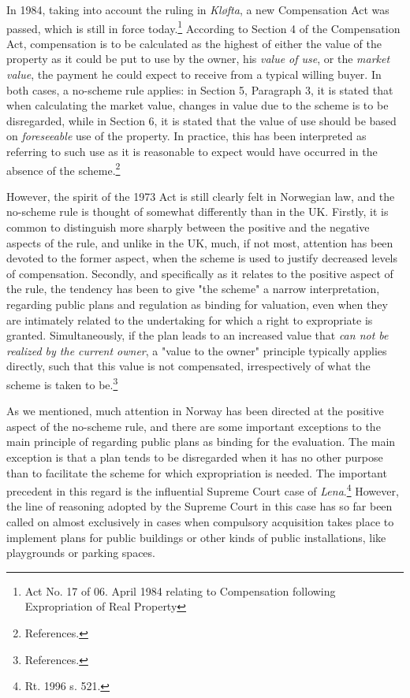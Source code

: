 In 1984, taking into account the ruling in \emph{Kløfta}, a new Compensation Act was passed, which is still in force today.\footnote{Act No. 17 of 06. April 1984 relating to Compensation following Expropriation of Real Property} According to Section 4 of the Compensation Act, compensation is to be calculated as the highest of either the value of the property as it could be put to use by the owner, his \emph{value of use}, or the \emph{market value}, the payment he could expect to receive from a typical willing buyer. In both cases, a no-scheme rule applies: in Section 5, Paragraph 3, it is stated that when calculating the market value, changes in value due to the scheme is to be disregarded, while in Section 6, it is stated that the value of use should be based on \emph{foreseeable} use of the property. In practice, this has been interpreted as referring to such use as it is reasonable to expect would have occurred in the absence of the scheme.\footnote{References.} 

However, the spirit of the 1973 Act is still clearly felt in Norwegian law, and the no-scheme rule is thought of somewhat differently than in the UK. Firstly, it is common to distinguish more sharply between the positive and the negative aspects of the rule, and unlike in the UK, much, if not most, attention has been devoted to the former aspect, when the scheme is used to justify decreased levels of compensation. Secondly, and specifically as it relates to the positive aspect of the rule, the tendency has been to give "the scheme" a narrow interpretation, regarding public plans and regulation as binding for valuation, even when they are intimately related to the undertaking for which a right to expropriate is granted. Simultaneously, if the plan leads to an increased value that \emph{can not be realized by the current owner}, a "value to the owner" principle typically applies directly, such that this value is not compensated, irrespectively of what the scheme is taken to be.\footnote{References.}

As we mentioned, much attention in Norway has been directed at the positive aspect of the no-scheme rule, and there are some important exceptions to the main principle of regarding public plans as binding for the evaluation. The main exception is that a plan tends to be disregarded when it has no other purpose than to facilitate the scheme for which expropriation is needed. The important precedent in this regard is the influential Supreme Court case of \emph{Lena}.\footnote{Rt. 1996 s. 521.} However, the line of reasoning adopted by the Supreme Court in this case has so far been called on almost exclusively in cases when compulsory acquisition takes place to implement plans for public buildings or other kinds of public installations, like playgrounds or parking spaces.


